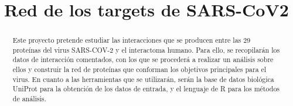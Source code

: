 \documentclass{bmcart}
\begin{document}
	\begin{frontmatter}
	
		\begin{fmbox}
						
			\title{Red de los targets de SARS-CoV2}
			
			\author[
			  addressref={aff1},
			  corref={aff1},
			  email={ireero99@uma.es}
			]{ }
			\author[
			  addressref={aff1},
			  corref={aff1},
			  email={paulandujar@uma.es}
			]{ }
			\author[
			  addressref={aff1},
			  corref={aff1},
			  email={0619884107@uma.es}
			]{ }
			\author[
			  addressref={aff1},
			  corref={aff1},
			  email={delcastillosoledad@uma.es}
			]{ }
			
			
			\address[id=aff1]{%
			  ,             %
			  ,          %
			  ,                              %
			}
		
		\end{fmbox}

		
		\begin{abstractbox}
		
			\begin{abstract} %
			Este proyecto pretende estudiar las interacciones que se producen entre las 29 proteínas del virus SARS-COV-2 y el interactoma humano. Para ello, se recopilarán los datos de interacción comentados, con los que se procederá a realizar un análisis sobre ellos y construir la red de proteínas que conforman los objetivos principales para el virus. En cuanto a las herramientas que se utilizarán, serán la base de datos biológica UniProt para la obtención de los datos de entrada, y el lenguaje de R para los métodos de análisis.
			
			\end{abstract}
			
			
			\begin{keyword}
			\end{keyword}
		
		
		\end{abstractbox}
	
	\end{frontmatter}
	
\end{document}
